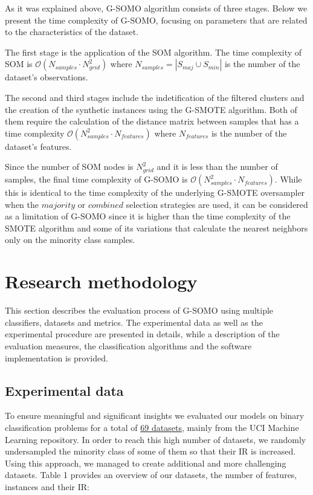 \documentclass[parskip=full]{scrartcl}
\begin{document}
As it was explained above, G-SOMO algorithm consists of three stages. Below we present the time complexity of G-SOMO, focusing on parameters that are related to the characteristics of the dataset. 

The first stage is the application of the SOM algorithm.  The time complexity of SOM is \( \mathcal{O}(N_{samples} \cdot N_{grid}^2 ) \) where \( N_{samples} = |S_{maj} \cup S_{min}| \) is the number of the dataset's observations. 

The second and third stages include the indetification of the filtered clusters and the creation of the synthetic instances using the G-SMOTE algorithm. Both of them require the calculation of the distance matrix between samples that has a time complexity \( \mathcal{O}(N_{samples}^2 \cdot N_{features}) \) where \( N_{features} \) is the number of the dataset's features.

Since the number of SOM nodes is \( N_{grid}^2 \) and it is less than the number of samples, the final time complexity of G-SOMO is \( \mathcal{O}(N_{samples}^2 \cdot N_{features}) \). While this is identical to the time complexity of the underlying G-SMOTE oversampler when the $ majority $ or $ combined $ selection strategies are used, it can be considered as a limitation of G-SOMO since it is higher than the time complexity of the SMOTE algorithm and some of its variations that calculate the nearest neighbors only on the minority class samples.

\section{Research methodology}

This section describes the evaluation process of G-SOMO using multiple classifiers, datasets and metrics. The experimental data as well as the experimental procedure are presented in details, while a description of the evaluation measures, the classification algorithms and the software implementation is provided.

\subsection{Experimental data}

To ensure meaningful and significant insights we evaluated our models on binary classification problems for a total of \href{https://github.com/AlgoWit/publications/blob/master/gsomo/data/gsomo.db}{69 datasets}, mainly from the UCI Machine Learning repository. In order to reach this high number of datasets, we randomly undersampled the minority class of some of them so that their IR is increased. Using this approach, we managed to create additional and more challenging datasets. Table 1 provides an overview of our datasets, the number of features, instances and their IR:
\end{document}
